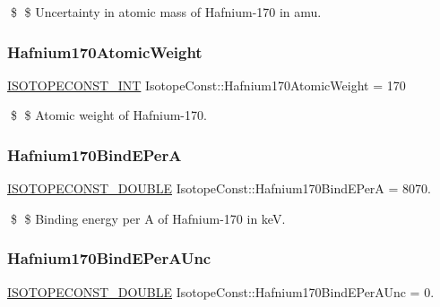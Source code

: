 \$ \$ Uncertainty in atomic mass of Hafnium-\/170 in amu. \mbox{\label{group___isotope_const-_hafnium-_hf170_ga9860aae7b3de75bd7301a3aa19ca14a9}} 
\subsubsection{\texorpdfstring{Hafnium170\+Atomic\+Weight}{Hafnium170AtomicWeight}}
{\footnotesize\ttfamily \mbox{\hyperlink{group___isotope_const-_macros_ga5f18360b3e99483a35c32d789e62621c}{I\+S\+O\+T\+O\+P\+E\+C\+O\+N\+S\+T\+\_\+\+I\+NT}} Isotope\+Const\+::\+Hafnium170\+Atomic\+Weight = 170}

\$ \$ Atomic weight of Hafnium-\/170. \mbox{\label{group___isotope_const-_hafnium-_hf170_ga41c9295757fe3b709464accb75fadd48}} 
\subsubsection{\texorpdfstring{Hafnium170\+Bind\+E\+PerA}{Hafnium170BindEPerA}}
{\footnotesize\ttfamily \mbox{\hyperlink{group___isotope_const-_macros_ga8f45a7272ce02c0b4c65c44636ed719a}{I\+S\+O\+T\+O\+P\+E\+C\+O\+N\+S\+T\+\_\+\+D\+O\+U\+B\+LE}} Isotope\+Const\+::\+Hafnium170\+Bind\+E\+PerA = 8070.}

\$ \$ Binding energy per A of Hafnium-\/170 in keV. \mbox{\label{group___isotope_const-_hafnium-_hf170_gaeba9146a4c99b4fb92b4ba552238decd}} 
\subsubsection{\texorpdfstring{Hafnium170\+Bind\+E\+Per\+A\+Unc}{Hafnium170BindEPerAUnc}}
{\footnotesize\ttfamily \mbox{\hyperlink{group___isotope_const-_macros_ga8f45a7272ce02c0b4c65c44636ed719a}{I\+S\+O\+T\+O\+P\+E\+C\+O\+N\+S\+T\+\_\+\+D\+O\+U\+B\+LE}} Isotope\+Const\+::\+Hafnium170\+Bind\+E\+Per\+A\+Unc = 0.}

